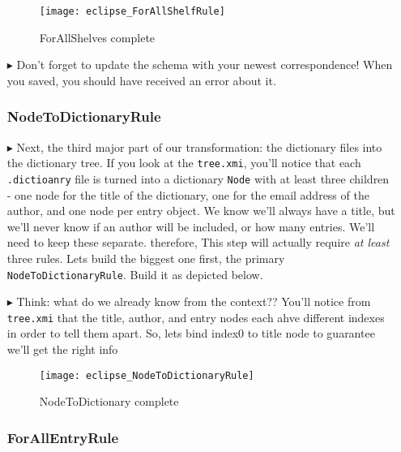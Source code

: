 \begin{itemize}
\begin{figure}[htbp]
\begin{center}
  \texttt{[image: eclipse\_ForAllShelfRule]}
  \caption{ForAllShelves complete}
  \label{eclipse:ForAllShelvesRule}
\end{center}
\end{figure}

\item[$\blacktriangleright$] Don't forget to update the schema with your newest correspondence! When you saved, you should have received an error about it.

\subsubsection{NodeToDictionaryRule} %

\item[$\blacktriangleright$] Next, the third major part of our transformation: the dictionary files into the dictionary tree. If you look at the
\texttt{tree.xmi}, you'll notice that each \texttt{.dictioanry} file is turned into a dictionary \texttt{Node} with at least three children - one node for the
title of the dictionary, one for the email address of the author, and one node per entry object. We know we'll always have a title, but we'll never know if an
author will be included, or how many entries. We'll need to keep these separate. therefore, This step will actually require \emph{at least} three rules. Lets
build the biggest one first, the primary \texttt{NodeToDictionaryRule}. Build it as depicted below.

\item[$\blacktriangleright$] Think: what do we already know from the context?? You'll notice from \texttt{tree.xmi} that the title, author, and entry nodes each
ahve different indexes in order to tell them apart. So, lets bind index0 to title node to guarantee we'll get the right info

\begin{figure}[htbp]
\begin{center}
  \texttt{[image: eclipse\_NodeToDictionaryRule]}
  \caption{NodeToDictionary complete}
  \label{eclipse:NodeToDictionaryRule}
\end{center}
\end{figure}

\subsubsection{ForAllEntryRule} %


\end{itemize}
